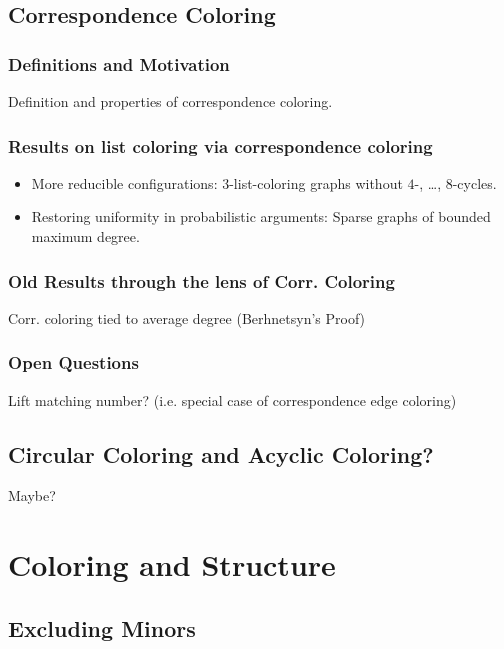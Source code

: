 \documentclass[12pt,twoside,openright,a4paper]{book}
\begin{document}
\chapter{Correspondence Coloring}


\section{Definitions and Motivation}

Definition and properties of correspondence coloring.

\section{Results on list coloring via correspondence coloring}

\begin{itemize}
\item More reducible configurations: $3$-list-coloring graphs without $4$-, \ldots, $8$-cycles.
\item Restoring uniformity in probabilistic arguments: Sparse graphs of bounded maximum degree.
\end{itemize}

\section{Old Results through the lens of Corr. Coloring}

Corr. coloring tied to average degree (Berhnetsyn's Proof)

\section{Open Questions}

Lift matching number? (i.e. special case of correspondence edge coloring)

\chapter{Circular Coloring and Acyclic Coloring?}

Maybe?

\part{Coloring and Structure}

\chapter{Excluding Minors}
\end{document}
